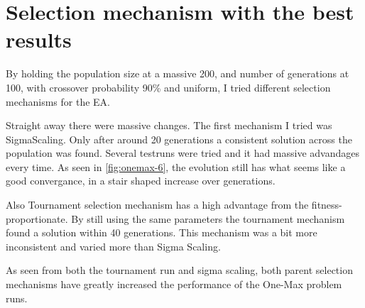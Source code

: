 \section{Selection mechanism with the best results}
By holding the population size at a massive 200, and number of generations at 100, with crossover
probability 90\% and uniform, I tried different selection mechanisms for the EA. 

Straight away there were massive changes. The first mechanism I tried was SigmaScaling. Only after
around 20 generations a consistent solution across the population was found. Several testruns were tried
and it had massive advandages every time. As seen in \autoref{fig:onemax-6}, the evolution still has what
seems like a good convergance, in a stair shaped increase over generations.


Also Tournament selection mechanism has a high advantage from the fitness-proportionate. By still using
the same parameters the tournament mechanism found a solution within 40 generations. This mechanism
was a bit more inconsistent and varied more than Sigma Scaling. 


As seen from both the tournament run and sigma scaling, both parent selection mechanisms have greatly
increased the performance of the One-Max problem runs.